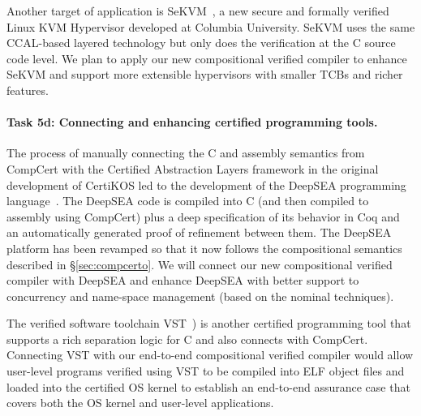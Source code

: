 Another target of application is SeKVM~\cite{sekvm21a,sekvm21b,tao21},
a new secure and formally verified Linux KVM Hypervisor developed at
Columbia University. SeKVM uses the same CCAL-based layered technology 
but only does the verification at the C source code level. We plan to
apply our new compositional verified compiler to enhance SeKVM and support
more extensible hypervisors with smaller TCBs and richer features.


\vspace*{-2ex}
\paragraph*{Task 5d: Connecting and enhancing certified programming tools.}
The process of manually connecting the C and assembly semantics from
CompCert with the Certified Abstraction Layers framework in the
original development of CertiKOS led to the development of the DeepSEA
programming language~\cite{deepsea19}.  The DeepSEA code is compiled
into C (and then compiled to assembly using CompCert) plus a deep
specification of its behavior in Coq and an automatically generated
proof of refinement between them. The DeepSEA platform has been
revamped so that it now follows the compositional semantics described
in \S\ref{sec:compcerto}. We will connect our new compositional
verified compiler with DeepSEA and enhance DeepSEA with better support
to concurrency and name-space management (based on the nominal techniques).

The verified software toolchain VST~\cite{appel11:vst}) is another
certified programming tool that supports a rich separation logic for C
and also connects with CompCert. Connecting VST with our end-to-end
compositional verified compiler would allow user-level programs
verified using VST to be compiled into ELF object files and loaded
into the certified OS kernel to establish an end-to-end assurance case
that covers both the OS kernel and user-level applications.

